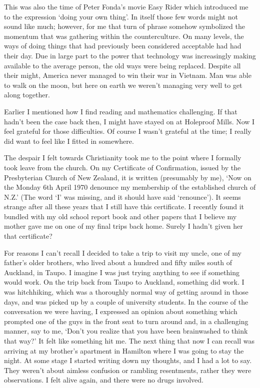 This was also the time of Peter Fonda's movie Easy Rider which
introduced me to the expression `doing your own thing'. In itself those
few words might not sound like much; however, for me that turn of phrase
somehow symbolized the momentum that was gathering within the
counterculture. On many levels, the ways of doing things that had
previously been considered acceptable had had their day. Due in large
part to the power that technology was increasingly making available to
the average person, the old ways were being replaced. Despite all their
might, America never managed to win their war in Vietnam. Man was able
to walk on the moon, but here on earth we weren't managing very well to
get along together.

Earlier I mentioned how I find reading and mathematics challenging. If
that hadn't been the case back then, I might have stayed on at Holeproof
Mills. Now I feel grateful for those difficulties. Of course I wasn't
grateful at the time; I really did want to feel like I fitted in
somewhere.

The despair I felt towards Christianity took me to the point where I
formally took leave from the church. On my Certificate of Confirmation,
issued by the Presbyterian Church of New Zealand, it is written
(presumably by me), `Now on the Monday 6th April 1970 denounce my
membership of the established church of N.Z.' (The word `I' was missing,
and it should have said `renounce'). It seems strange after all these
years that I still have this certificate. I recently found it bundled
with my old school report book and other papers that I believe my mother
gave me on one of my final trips back home. Surely I hadn't given her
that certificate?

For reasons I can't recall I decided to take a trip to visit my uncle,
one of my father's older brothers, who lived about a hundred and fifty
miles south of Auckland, in Taupo\cite{taupo}.
I imagine I was just trying anything to see if something would work. On
the trip back from Taupo to Auckland, something did work. I was
hitchhiking, which was a thoroughly normal way of getting around in
those days, and was picked up by a couple of university students. In the
course of the conversation we were having, I expressed an opinion about
something which prompted one of the guys in the front seat to turn
around and, in a challenging manner, say to me, `Don't you realize that
you have been brainwashed to think that way?' It felt like something hit
me. The next thing that now I can recall was arriving at my brother's
apartment in Hamilton where I was going to stay the night. At some stage
I started writing down my thoughts, and I had a lot to say. They weren't
about aimless confusion or rambling resentments, rather they were
observations. I felt alive again, and there were no drugs involved.

